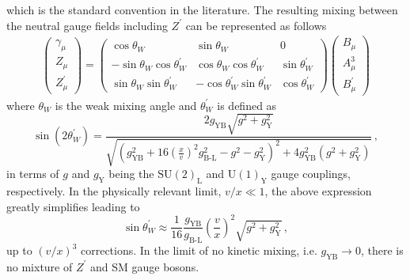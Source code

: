 \documentclass[a4paper,11pt]{article}
\renewcommand{\(}{\left(}
\renewcommand{\)}{\right)}
\renewcommand{\[}{\left[}
\renewcommand{\]}{\right]}
\newcommand{\U}[1]{\mathrm{U}(1)_{\mathrm{#1}}}			%
\newcommand{\SU}[2]{\mathrm{SU}(#1)_{\mathrm{#2}}}		%
\newcommand{\ro}[1]{\textrm{#1}}
\begin{document}
which is the standard convention in the literature. The resulting mixing between the neutral gauge fields including $Z^\prime$ can be represented as follows
%
\begin{equation}
\begin{aligned}
\begin{pmatrix}
\gamma_\mu \\
Z_\mu \\
Z^\prime_\mu
\end{pmatrix}
=
\begin{pmatrix}
\cos \theta_W & \sin \theta_W & 0\\
-\sin \theta_W \cos \theta_W^\prime & \cos \theta_W \cos \theta_W^\prime & \sin \theta_W^\prime \\
\sin \theta_W \sin \theta_W^\prime & -\cos \theta_W^\prime \sin \theta_W^\prime & \cos \theta_W^\prime
\end{pmatrix}
\begin{pmatrix}
B_\mu \\
A^3_\mu \\
B^\prime_\mu
\end{pmatrix}
\end{aligned}
\label{eq:g-Z-Zp}
\end{equation}	
%
where $\theta_W$ is the weak mixing angle and $\theta^\prime_W$ is defined as
\begin{equation}
\sin(2 \theta^\prime_W) = \frac{2 g_\ro{YB} \sqrt{g^2 + g_\ro{Y}^2}}{\sqrt{(g_\ro{YB}^2 + 16 (\frac{x}{v})^2 g_\ro{B-L}^2 - g^2 - g_\ro{Y}^2)^2 + 4 g_\ro{YB}^2 (g^2 + g_\ro{Y}^2)} }\,,
\label{eq:theta-p-full}
\end{equation}
in terms of $g$ and $g_\ro{Y}$ being the $\SU{2}{L}$ and $\U{Y}$ gauge couplings, respectively. In the physically relevant limit, $v/x \ll 1$, the above expression greatly simplifies leading to
\begin{equation}
	\sin \theta_W^\prime \approx \dfrac{1}{16
	} \dfrac{g_\ro{YB}}{g_\ro{B-L}}\(\dfrac{v}{x}\)^2 \sqrt{g^2 + g_\ro{Y}^2} \,,
	\label{eq:theta-p}
\end{equation}
%
up to $(v/x)^3$ corrections. In the limit of no kinetic mixing, i.e. $g_\ro{YB} \to 0$, there is no mixture of $Z^\prime$ and SM gauge bosons. 
\end{document}
